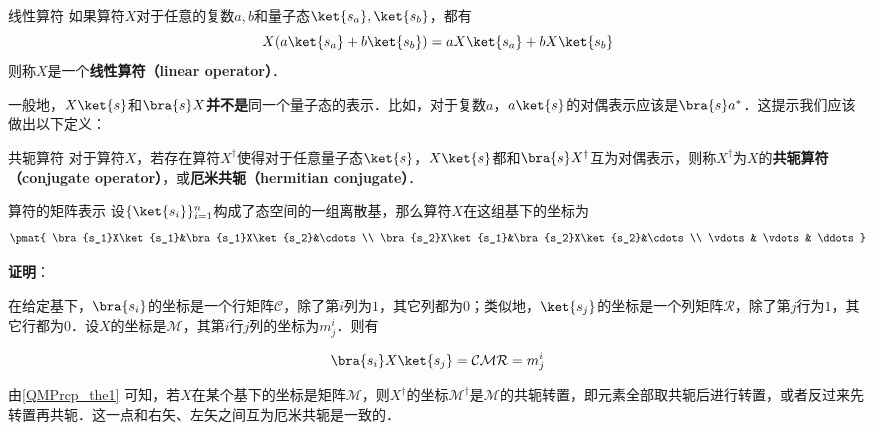 \begin{definition}{线性算符}\label{QMPrcp_def11}
如果算符$X$对于任意的复数$a, b$和量子态$\ket{s_a}, \ket{s_b}$，都有
\begin{equation}
X(a\ket{s_a}+b\ket{s_b}) = aX\ket{s_a}+bX\ket{s_b}
\end{equation}
则称$X$是一个\textbf{线性算符（linear operator）}．
\end{definition}


一般地，$X\ket{s}$和$\bra{s}X$\textbf{并不是}同一个量子态的表示．比如，对于复数$a$，$a\ket{s}$的对偶表示应该是$\bra{s}a^*$．这提示我们应该做出以下定义：

\begin{definition}{共轭算符}\label{QMPrcp_def5}
对于算符$X$，若存在算符$X^\dagger$使得对于任意量子态$\ket{s}$，$X\ket{s}$都和$\bra{s}X^\dagger$互为对偶表示，则称$X^\dagger$为$X$的\textbf{共轭算符（conjugate operator）}，或\textbf{厄米共轭（hermitian conjugate）}．
\end{definition}





\begin{theorem}{算符的矩阵表示}\label{QMPrcp_the1}
设$\{\ket{s_i}\}_{i=1}^n$构成了态空间的一组离散基，那么算符$X$在这组基下的坐标为
\begin{equation}
\pmat{
    \bra{s_1}X\ket{s_1}&\bra{s_1}X\ket{s_2}&\cdots\\
    \bra{s_2}X\ket{s_1}&\bra{s_2}X\ket{s_2}&\cdots\\
    \vdots & \vdots& \ddots
}
\end{equation}
\end{theorem}

\textbf{证明}：

在给定基下，$\bra{s_i}$的坐标是一个行矩阵$\mathcal{C}$，除了第$i$列为$1$，其它列都为$0$；类似地，$\ket{s_j}$的坐标是一个列矩阵$\mathcal{R}$，除了第$j$行为$1$，其它行都为$0$．设$X$的坐标是$\mathcal{M}$，其第$i$行$j$列的坐标为$m^i_j$．则有

\begin{equation}
\bra{s_i}X\ket{s_j} = \mathcal{CMR} = m^i_j
\end{equation}







由\autoref{QMPrcp_the1} 可知，若$X$在某个基下的坐标是矩阵$\mathcal{M}$，则$X^\dagger$的坐标$\mathcal{M}^\dagger$是$\mathcal{M}$的共轭转置，即元素全部取共轭后进行转置，或者反过来先转置再共轭．这一点和右矢、左矢之间互为厄米共轭是一致的．






